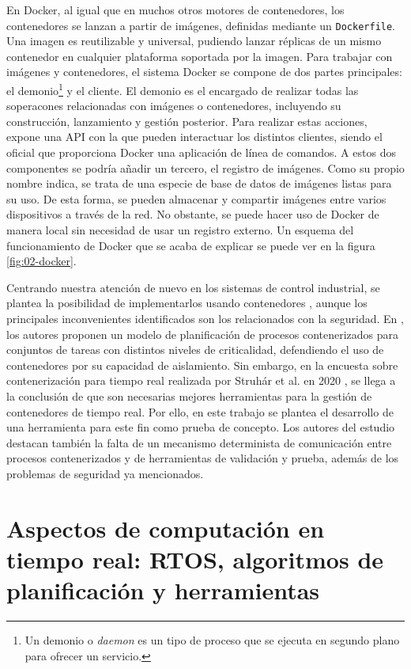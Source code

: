 En Docker, al igual que en muchos otros motores de contenedores, los
contenedores se lanzan a partir de imágenes, definidas mediante un
\texttt{Dockerfile}. Una imagen es reutilizable y universal, pudiendo lanzar
réplicas de un mismo contenedor en cualquier plataforma soportada por la imagen.
Para trabajar con imágenes y contenedores, el sistema Docker se compone de dos
partes principales: el demonio\footnote{Un demonio o \textit{daemon} es un tipo
  de proceso que se ejecuta en segundo plano para ofrecer un servicio.} y el
cliente. El demonio es el encargado de realizar todas las soperacones
relacionadas con imágenes o contenedores, incluyendo su construcción,
lanzamiento y gestión posterior. Para realizar estas acciones, expone una API
con la que pueden interactuar los distintos clientes, siendo el oficial que
proporciona Docker una aplicación de línea de comandos. A estos dos componentes
se podría añadir un tercero, el registro de imágenes. Como su propio nombre
indica, se trata de una especie de base de datos de imágenes listas para su uso.
De esta forma, se pueden almacenar y compartir imágenes entre varios
dispositivos a través de la red. No obstante, se puede hacer uso de Docker de
manera local sin necesidad de usar un registro externo. Un esquema del
funcionamiento de Docker que se acaba de explicar se puede ver en la figura
\ref{fig:02-docker}.

Centrando nuestra atención de nuevo en los sistemas de control industrial, se
plantea la posibilidad de implementarlos usando contenedores
\cite{hofer_industrial_2019}, aunque los principales inconvenientes
identificados son los relacionados con la seguridad. En
\cite{cinque_rt-cases_2019}, los autores proponen un modelo de planificación de
procesos contenerizados para conjuntos de tareas con distintos niveles de
criticalidad, defendiendo el uso de contenedores por su capacidad de
aislamiento. Sin embargo, en la encuesta sobre contenerización para tiempo real
realizada por Struhár et al. en 2020 \cite{struhar_real-time_2020}, se llega a
la conclusión de que son necesarias mejores herramientas para la gestión de
contenedores de tiempo real. Por ello, en este trabajo se plantea el desarrollo
de una herramienta para este fin como prueba de concepto. Los autores del
estudio destacan también la falta de un mecanismo determinista de comunicación
entre procesos contenerizados y de herramientas de validación y prueba, además
de los problemas de seguridad ya mencionados.

\section{Aspectos de computación en tiempo real: RTOS, algoritmos de
  planificación y herramientas}
\label{sec:02-real_time}

